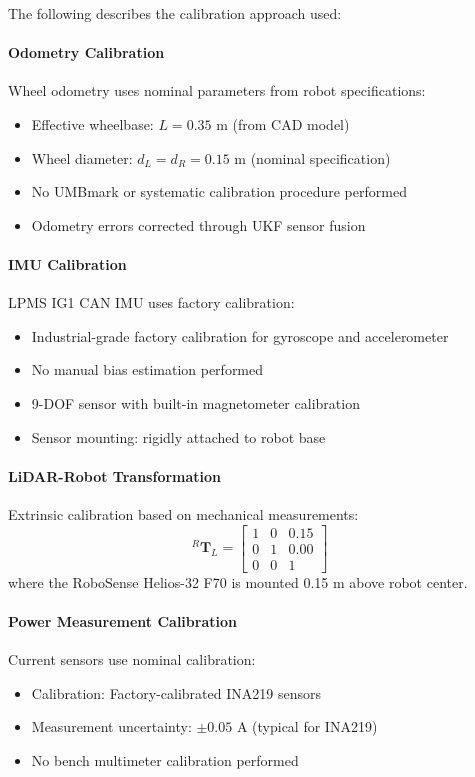 The following describes the calibration approach used:

\paragraph{Odometry Calibration}
Wheel odometry uses nominal parameters from robot specifications:
\begin{itemize}
    \item Effective wheelbase: $L = 0.35$ m (from CAD model)
    \item Wheel diameter: $d_L = d_R = 0.15$ m (nominal specification)
    \item No UMBmark or systematic calibration procedure performed
    \item Odometry errors corrected through UKF sensor fusion
\end{itemize}

\paragraph{IMU Calibration}
LPMS IG1 CAN IMU uses factory calibration:
\begin{itemize}
    \item Industrial-grade factory calibration for gyroscope and accelerometer
    \item No manual bias estimation performed
    \item 9-DOF sensor with built-in magnetometer calibration
    \item Sensor mounting: rigidly attached to robot base
\end{itemize}

\paragraph{LiDAR-Robot Transformation}
Extrinsic calibration based on mechanical measurements:
\begin{equation}
^R\mathbf{T}_L = \begin{bmatrix} 1 & 0 & 0.15 \\ 0 & 1 & 0.00 \\ 0 & 0 & 1 \end{bmatrix}
\end{equation}
where the RoboSense Helios-32 F70 is mounted 0.15 m above robot center.

\paragraph{Power Measurement Calibration}
Current sensors use nominal calibration:
\begin{itemize}
    \item Calibration: Factory-calibrated INA219 sensors
    \item Measurement uncertainty: $\pm 0.05$ A (typical for INA219)
    \item No bench multimeter calibration performed
\end{itemize}

